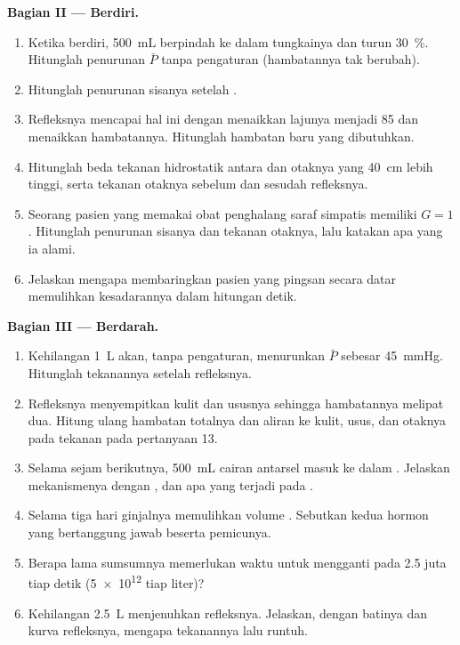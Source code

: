 \begin{problem}
\medskip
\noindent\textbf{Bagian II --- Berdiri.}
\begin{enumerate}[resume]
  \item Ketika berdiri, \qty{500}{mL} berpindah ke dalam 
        tungkainya dan  turun \qty{30}{\%}.
        Hitunglah penurunan $\bar P$ tanpa pengaturan (hambatannya tak
        berubah).
  \item Hitunglah penurunan sisanya setelah .
  \item Refleksnya mencapai hal ini dengan menaikkan lajunya menjadi
        85 dan menaikkan hambatannya. Hitunglah hambatan baru yang
        dibutuhkan.
  \item Hitunglah beda tekanan hidrostatik antara  dan
        otaknya yang \qty{40}{cm} lebih tinggi, serta tekanan 
        otaknya sebelum dan sesudah refleksnya.
  \item Seorang pasien yang memakai obat penghalang saraf simpatis
        memiliki $G = 1$. Hitunglah penurunan sisanya dan tekanan
        otaknya, lalu katakan apa yang ia alami.
  \item Jelaskan mengapa membaringkan pasien yang pingsan secara datar
        memulihkan kesadarannya dalam hitungan detik.
\end{enumerate}

\medskip
\noindent\textbf{Bagian III --- Berdarah.}
\begin{enumerate}[resume]
  \item Kehilangan \qty{1}{L} akan, tanpa pengaturan, menurunkan
        $\bar P$ sebesar \qty{45}{mmHg}. Hitunglah tekanannya setelah
        refleksnya.
  \item Refleksnya menyempitkan  kulit dan ususnya sehingga
        hambatannya melipat dua. Hitung ulang hambatan totalnya dan
        aliran ke kulit, usus, dan otaknya pada tekanan pada
        pertanyaan 13.
  \item Selama sejam berikutnya, \qty{500}{mL} cairan antarsel masuk
        ke dalam . Jelaskan mekanismenya dengan , dan apa yang terjadi pada .
  \item Selama tiga hari ginjalnya memulihkan volume .
        Sebutkan kedua hormon yang bertanggung jawab beserta
        pemicunya.
  \item Berapa lama sumsumnya memerlukan waktu untuk mengganti  pada \num{2.5} juta tiap detik (\num{5e12} tiap
        liter)?
  \item Kehilangan \qty{2.5}{L} menjenuhkan refleksnya. Jelaskan,
        dengan batinya dan kurva refleksnya, mengapa tekanannya lalu
        runtuh.
\end{enumerate}


\end{problem}
